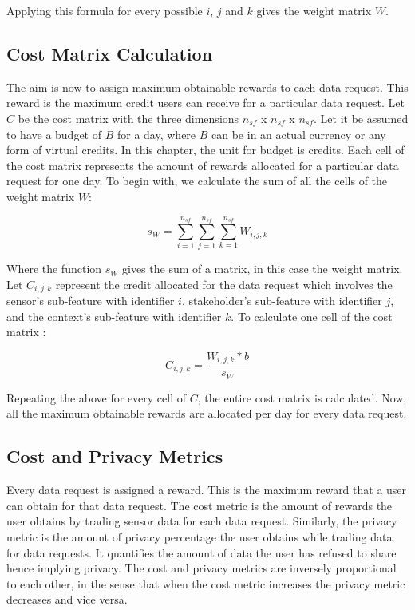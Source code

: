 Applying this formula for every possible $i$, $j$ and $k$ gives the weight matrix $W$.

\subsection{Cost Matrix Calculation}

The aim is now to assign maximum obtainable rewards to each data request. This reward is the maximum credit users can receive for a particular data request. Let $C$ be the cost matrix with the three dimensions $n_{sf}$ x $n_{sf}$ x $n_{sf}$.
Let it be assumed to have a budget of $B$ for a day, where
$B$ can be in an actual currency or any form of virtual credits. In this chapter, the unit for budget is credits. Each cell of the cost matrix represents the amount of rewards allocated for a particular data request for one day.
To begin with, we calculate the sum of all the cells of the weight matrix $W$:

\begin{equation}
s_{W} = \sum\limits_{i=1}^{n_{sf}} \sum\limits_{j=1}^{n_{sf}} \sum\limits_{k=1}^{n_{sf}} W_{i,j,k}
\end{equation}

Where the function $s_{W}$ gives the sum of a matrix, in this case the weight matrix.
Let $C_{i,j,k}$ represent the credit allocated for the data request which involves the sensor's sub-feature with identifier $i$, stakeholder's sub-feature with identifier $j$, and the context's sub-feature with identifier $k$. To calculate one cell of the cost matrix :

\begin{equation}
C_{i,j,k} = \frac{W_{i,j,k} * b}{s_{W}}
\end{equation}

Repeating the above for every cell of $C$, the entire cost matrix is calculated. Now, all the maximum obtainable rewards are allocated per day for every data request.

\subsection{Cost and Privacy Metrics} \label{o}
Every data request is assigned a reward. This is the maximum reward that a user can obtain for that data request.
The cost metric is the amount of rewards the user obtains by trading sensor data for each data request. Similarly, the privacy metric is the amount of privacy percentage the user obtains while trading data for data requests. It quantifies the amount of data the user has refused to share hence implying privacy. The cost and privacy metrics are inversely proportional to each other, in the sense that when the cost metric increases the privacy metric decreases and vice versa.

